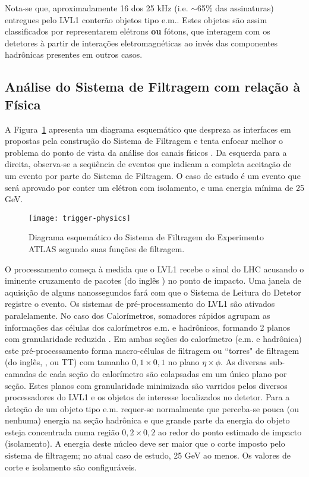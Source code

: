 Nota-se que, aproximadamente 16 dos 25 kHz (i.e. $\sim$65\% das assinaturas)
entregues pelo LVL1 conterão objetos tipo e.m.. Estes objetos são assim
classificados por representarem elétrons \textbf{ou} fótons, que interagem com
os detetores à partir de interações eletromagnéticas ao invés das componentes
hadrônicas presentes em outros casos. 

\subsection{Análise do Sistema de Filtragem com relação à Física}

A Figura~\ref{fig:trigger-physics} apresenta um diagrama esquemático que
despreza as interfaces em  propostas pela construção do Sistema
de Filtragem e tenta enfocar melhor o problema do ponto de vista da análise
dos canais físicos . Da esquerda para a direita, observa-se a
seqüência de eventos que indicam a completa aceitação de um evento por parte
do Sistema de Filtragem. O caso de estudo é um evento que será aprovado por
conter um elétron com isolamento, e uma energia mínima de 25 GeV. 

\begin{figure}
\begin{center}
\texttt{[image: trigger-physics]}
\end{center}
\caption{Diagrama esquemático do Sistema de Filtragem do Experimento ATLAS
segundo suas funções de filtragem.}
\label{fig:trigger-physics}
\end{figure}

O processamento começa à medida que o LVL1 recebe o sinal do LHC acusando o
iminente cruzamento de pacotes (do inglês ) no ponto de
impacto. Uma janela de aquisição de alguns nanossegundos fará com que o
Sistema de Leitura do Detetor registre o evento. Os sistemas de
pré-processamento do LVL1 são ativados paralelamente. No caso dos
Calorímetros, somadores rápidos \cite{seixas:adder} agrupam as informações das
células dos calorímetros e.m. e hadrônicos, formando 2 planos com
granularidade reduzida \cite{l1-tdr}. Em ambas seções do calorímetro (e.m. e
hadrônica) este pré-processamento forma macro-células de filtragem ou
``torres" de filtragem (do inglês, , ou TT) com tamanho
$0,1\times0,1$ no plano $\eta\times\phi$. As diversas sub-camadas de cada
seção do calorímetro são colapsadas em um único plano por seção. Estes planos
com granularidade minimizada são varridos pelos diversos processadores do LVL1
e os objetos de interesse localizados no detetor. Para a deteção de um objeto
tipo e.m. requer-se normalmente que perceba-se pouca (ou nenhuma) energia na
seção hadrônica e que grande parte da energia do objeto esteja concentrada
numa região $0,2\times0,2$ ao redor do ponto estimado de impacto
(isolamento). A energia deste núcleo deve ser maior que o corte imposto pelo
sistema de filtragem; no atual caso de estudo, 25 GeV ao menos. Os valores de
corte e isolamento são configuráveis.

